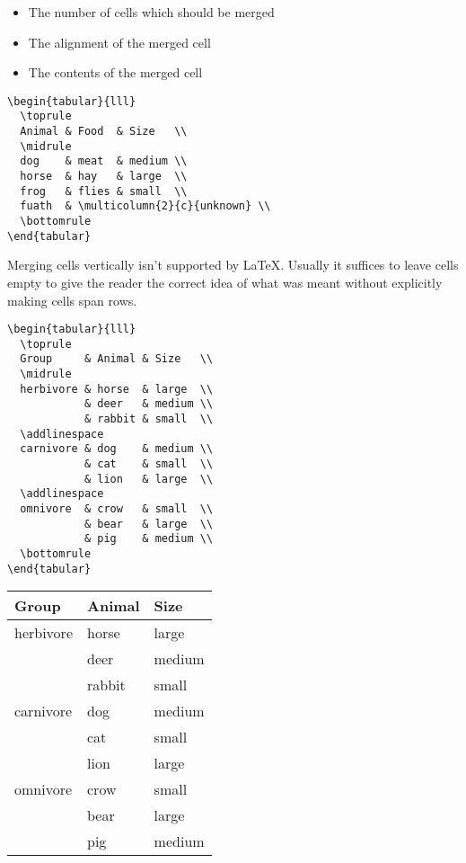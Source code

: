 \documentclass{article}
\begin{document}
\begin{itemize}
    \item The number of cells which should be merged
    \item The alignment of the merged cell
    \item The contents of the merged cell
\end{itemize}

\begin{verbatim}
\begin{tabular}{lll}
  \toprule
  Animal & Food  & Size   \\
  \midrule
  dog    & meat  & medium \\
  horse  & hay   & large  \\
  frog   & flies & small  \\
  fuath  & \multicolumn{2}{c}{unknown} \\
  \bottomrule
\end{tabular}
\end{verbatim}

Merging cells vertically isn’t supported by LaTeX. Usually it suffices to leave cells empty to give the reader the correct idea of what was meant without explicitly making cells span rows.

\begin{verbatim}
\begin{tabular}{lll}
  \toprule
  Group     & Animal & Size   \\
  \midrule
  herbivore & horse  & large  \\
            & deer   & medium \\
            & rabbit & small  \\
  \addlinespace
  carnivore & dog    & medium \\
            & cat    & small  \\
            & lion   & large  \\
  \addlinespace
  omnivore  & crow   & small  \\
            & bear   & large  \\
            & pig    & medium \\
  \bottomrule
\end{tabular}
\end{verbatim}

\begin{tabular}{lll}
  \toprule
  Group     & Animal & Size   \\
  \midrule
  herbivore & horse  & large  \\
            & deer   & medium \\
            & rabbit & small  \\
  \addlinespace
  carnivore & dog    & medium \\
            & cat    & small  \\
            & lion   & large  \\
  \addlinespace
  omnivore  & crow   & small  \\
            & bear   & large  \\
            & pig    & medium \\
  \bottomrule
\end{tabular}
\end{document}
